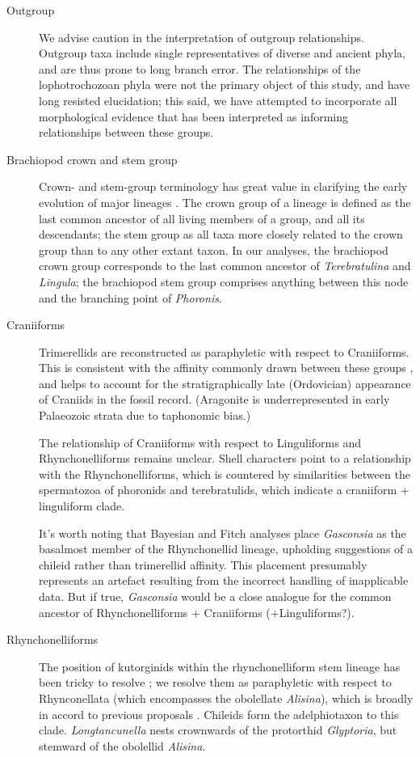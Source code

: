\documentclass[openany]{book}
\theoremstyle{definition}
\theoremstyle{definition}
\theoremstyle{definition}
\theoremstyle{remark}
\begin{document}
\begin{description}
\item[Outgroup]
We advise caution in the interpretation of outgroup relationships.
Outgroup taxa include single representatives of diverse and ancient
phyla, and are thus prone to long branch error. The relationships of the
lophotrochozoan phyla were not the primary object of this study, and
have long resisted elucidation; this said, we have attempted to
incorporate all morphological evidence that has been interpreted as
informing relationships between these groups.
\item[Brachiopod crown and stem group]
Crown- and stem-group terminology has great value in clarifying the
early evolution of major lineages \citep{Budd2000, Carlson2009}. The
crown group of a lineage is defined as the last common ancestor of all
living members of a group, and all its descendants; the stem group as
all taxa more closely related to the crown group than to any other
extant taxon. In our analyses, the brachiopod crown group corresponds to
the last common ancestor of \emph{Terebratulina} and \emph{Lingula}; the
brachiopod stem group comprises anything between this node and the
branching point of \emph{Phoronis}.
\item[Craniiforms]
Trimerellids are reconstructed as paraphyletic with respect to
Craniiforms. This is consistent with the affinity commonly drawn between
these groups \citep[e.g.][]{Williams2000LinguliformeaCraniiformea}, and
helps to account for the stratigraphically late (Ordovician) appearance
of Craniids in the fossil record. (Aragonite is underrepresented in
early Palaeozoic strata due to taphonomic bias.)

The relationship of Craniiforms with respect to Linguliforms and
Rhynchonelliforms remains unclear. Shell characters point to a
relationship with the Rhynchonelliforms, which is countered by
similarities between the spermatozoa of phoronids and terebratulids,
which indicate a craniiform + linguliform clade.

It's worth noting that Bayesian and Fitch analyses place
\emph{Gasconsia} as the basalmost member of the Rhynchonellid lineage,
upholding suggestions \citep{Holmer2014OrdovicianSilurian} of a chileid
rather than trimerellid affinity. This placement presumably represents
an artefact resulting from the incorrect handling of inapplicable data.
But if true, \emph{Gasconsia} would be a close analogue for the common
ancestor of Rhynchonelliforms + Craniiforms (+Linguliforms?).
\item[Rhynchonelliforms]
The position of kutorginids within the rhynchonelliform stem lineage has
been tricky to resolve \citep{Holmer2018Theattachment}; we resolve them
as paraphyletic with respect to Rhynconellata (which encompasses the
obolellate \emph{Alisina}), which is broadly in accord to previous
proposals \citep{Holmer2018Evolutionarysignificance}. Chileids form the
adelphiotaxon to this clade. \emph{Longtancunella}
\citep{Zhang2011Theexceptionally} nests crownwards of the protorthid
\emph{Glyptoria}, but stemward of the obolellid \emph{Alisina}.


\end{description}
\end{document}
